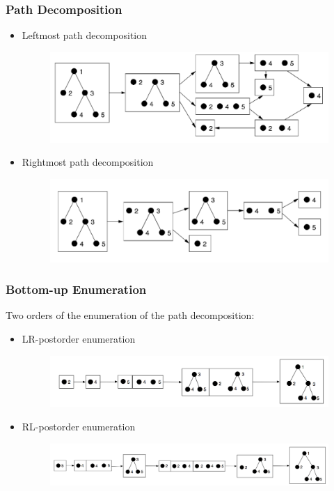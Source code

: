 \documentclass{beamer}
\begin{document}
\begin{frame}
\frametitle{Path Decomposition}
\begin{itemize}
\item Leftmost path decomposition
\begin{figure}
	\includegraphics[width=0.6\linewidth]{LeftmostPathDecomposition}
	\centering
\end{figure}
\item Rightmost path decomposition
\begin{figure}
	\includegraphics[width=0.6\linewidth]{RightmostPathDecomposition}
	\centering
\end{figure}
\end{itemize}
\end{frame}
\begin{frame}
\frametitle{Bottom-up Enumeration}
Two orders of the enumeration of the path decomposition:
\begin{itemize}
\item LR-postorder enumeration%
\begin{figure}
	\includegraphics[width=0.9\linewidth]{LRPostorder}
	\centering
\end{figure}
\item RL-postorder enumeration%
\begin{figure}
	\includegraphics[width=1.0\linewidth]{RLPostorder}
	\centering
\end{figure}
\end{itemize}
\end{frame}
\end{document}
